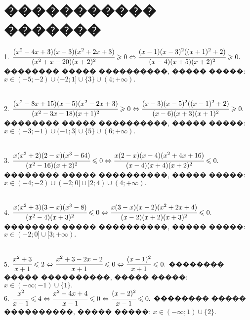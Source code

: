 \documentclass[12pt]{article}
\begin{document}
\section{����������� �������}
1. $\cfrac{(x^2-4x+3)(x-3)(x^2+2x+3)}{(x^2+x-20)(x+2)^2}\geqslant0 \Leftrightarrow \cfrac{(x-1)(x-3)^2((x+1)^2+2)}{(x-4)(x+5)(x+2)^2}\geqslant0.$ �������� ����� ����������, ����� �����: $x\in(-5;-2)\cup(-2;1]\cup\{3\}\cup(4;+\infty).$
\begin{figure}[ht!]
\end{figure}\\
2. $\cfrac{(x^2-8x+15)(x-5)(x^2-2x+3)}{(x^2-3x-18)(x+1)^2}\geqslant0\Leftrightarrow\cfrac{(x-3)(x-5)^2((x-1)^2+2)}{(x-6)(x+3)(x+1)^2}\geqslant0.$ �������� ����� ����������, ����� �����: $x\in(-3;-1)\cup(-1;3]\cup\{5\}\cup(6;+\infty).$
\begin{figure}[ht!]
\end{figure}\\
3. $\cfrac{x(x^2+2)(2-x)(x^3-64)}{(x^2-16)(x+2)^2}\leqslant 0 \Leftrightarrow \cfrac{x(2-x)(x-4)(x^2+4x+16)}{(x-4)(x+4)(x+2)^2}\leqslant 0.$ �������� ����� ����������, ����� �����: $x\in(-4;-2)\cup(-2;0]\cup[2;4)\cup(4;+\infty).$
\begin{figure}[ht!]
\end{figure}\\
4. $\cfrac{x(x^2+3)(3-x)(x^3-8)}{(x^2-4)(x+3)^2}\leqslant 0 \Leftrightarrow \cfrac{x(3-x)(x-2)(x^2+2x+4)}{(x-2)(x+2)(x+3)^2}\leqslant 0.$ �������� ����� ����������, ����� �����: $x\in(-2;0]\cup[3;+\infty).$
\begin{figure}[ht!]
\end{figure}\\
5. $\cfrac{x^2+3}{x+1}\leqslant2 \Leftrightarrow \cfrac{x^2+3-2x-2}{x+1} \leqslant0\Leftrightarrow \cfrac{(x-1)^2}{x+1} \leqslant0.$ �������� ����� ����������, ����� �����: $x\in(-\infty;-1)\cup\{1\}.$\\
6. $\cfrac{x^2}{x-1}\leqslant4 \Leftrightarrow \cfrac{x^2-4x+4}{x-1}\leqslant0 \Leftrightarrow \cfrac{(x-2)^2}{x-1}\leqslant0.$ �������� ����� ����������, ����� �����: $x\in(-\infty;1)\cup\{2\}.$\\
\end{document}
